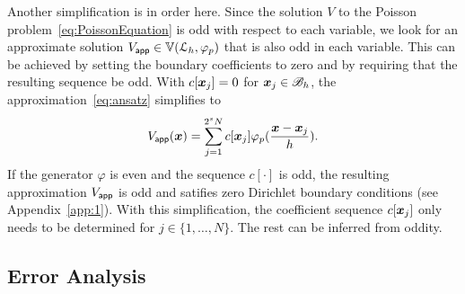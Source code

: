 Another simplification is in order here. Since the solution $V$ to the Poisson
problem~\eqref{eq:PoissonEquation} is odd with respect to each variable, we look
for an approximate solution $V_{\mathsf{app}} \in \mathbb{V}({\mathcal{L}_h},{\varphi_p})$
that is also odd in each variable. This can be achieved by setting
the boundary coefficients to zero and by requiring that the resulting sequence
be odd.  With $c[\boldsymbol{x}_j] = 0$ for $\boldsymbol{x}_j
\in \mathscr{B}_h$, the approximation~\eqref{eq:ansatz} simplifies to
\begin{equation}
\appf{V}(\vect{x}) = \sum_{j=1}^{2^sN} c[\vect{x}_j] 
\varphi_p(\frac{\vect{x} - \vect{x}_j}{h}).
\label{eq:simplifiedAnsatz}
\end{equation}
If the generator $\varphi$ is even and the sequence $c[\cdot]$ is odd,
the resulting approximation $V_{\mathsf{app}}$ is odd and satifies zero
Dirichlet boundary conditions (see Appendix~\ref{app:1}). With this
simplification, the coefficient sequence $c[\boldsymbol{x}_j]$ only needs to
be determined for $j \in \{1,\ldots,N\}$. The rest can be inferred
from oddity.  

\subsection{Error Analysis}


